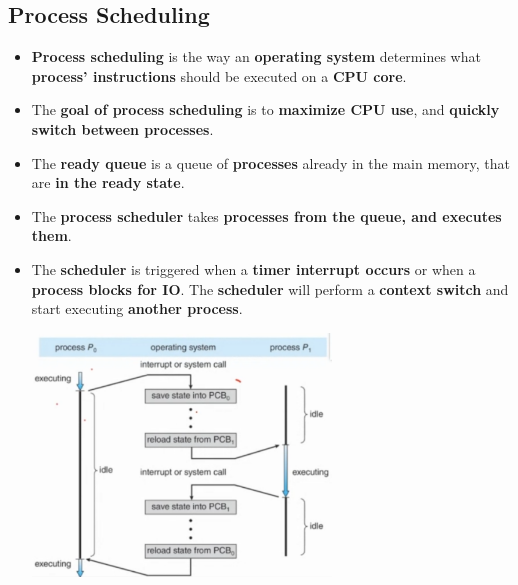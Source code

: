 \documentclass{article}
\begin{document}
    \subsection*{Process Scheduling}
    \begin{itemize}
        \item \textbf{Process scheduling} is the way an \textbf{operating system} determines what \textbf{process' instructions} should be executed on a \textbf{CPU core}.
        \item The \textbf{goal of process scheduling} is to \textbf{maximize CPU use}, and \textbf{quickly switch between processes}.
        \item The \textbf{ready queue} is a queue of \textbf{processes} already in the main memory, that are \textbf{in the ready state}.
        \item The \textbf{process scheduler} takes \textbf{processes from the queue, and executes them}.
        \item The \textbf{scheduler} is triggered when a \textbf{timer interrupt occurs} or when a \textbf{process blocks for IO}. The \textbf{scheduler} will perform a \textbf{context switch} and start executing \textbf{another process}.
        \begin{center}
            \includegraphics[width=300px]{images/Context-Switch.png}
        \end{center}
    \end{itemize}
\end{document}
